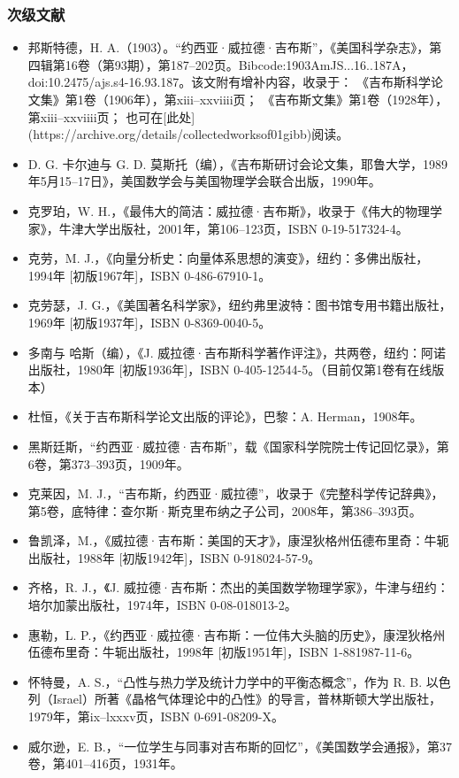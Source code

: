 \subsubsection{次级文献}
\begin{itemize}
\item 邦斯特德，H. A.（1903）。“约西亚·威拉德·吉布斯”，《美国科学杂志》，第四辑第16卷（第93期），第187–202页。Bibcode:1903AmJS...16..187A，doi:10.2475/ajs.s4-16.93.187。该文附有增补内容，收录于：
《吉布斯科学论文集》第1卷（1906年），第xiii–xxviiii页；
《吉布斯文集》第1卷（1928年），第xiii–xxviiii页；
也可在[此处](https://archive.org/details/collectedworksof01gibb)阅读。
\item D. G. 卡尔迪与 G. D. 莫斯托（编），《吉布斯研讨会论文集，耶鲁大学，1989年5月15–17日》，美国数学会与美国物理学会联合出版，1990年。
\item 克罗珀，W. H.，《最伟大的简洁：威拉德·吉布斯》，收录于《伟大的物理学家》，牛津大学出版社，2001年，第106–123页，ISBN 0-19-517324-4。
\item 克劳，M. J.，《向量分析史：向量体系思想的演变》，纽约：多佛出版社，1994年 [初版1967年]，ISBN 0-486-67910-1。
\item 克劳瑟，J. G.，《美国著名科学家》，纽约弗里波特：图书馆专用书籍出版社，1969年 [初版1937年]，ISBN 0-8369-0040-5。
\item 多南与 哈斯（编），《J. 威拉德·吉布斯科学著作评注》，共两卷，纽约：阿诺出版社，1980年 [初版1936年]，ISBN 0-405-12544-5。（目前仅第1卷有在线版本）
\item 杜恒，《关于吉布斯科学论文出版的评论》，巴黎：A. Herman，1908年。
\item 黑斯廷斯，“约西亚·威拉德·吉布斯”，载《国家科学院院士传记回忆录》，第6卷，第373–393页，1909年。
\item 克莱因，M. J.，“吉布斯，约西亚·威拉德”，收录于《完整科学传记辞典》，第5卷，底特律：查尔斯·斯克里布纳之子公司，2008年，第386–393页。
\item 鲁凯泽，M.，《威拉德·吉布斯：美国的天才》，康涅狄格州伍德布里奇：牛轭出版社，1988年 [初版1942年]，ISBN 0-918024-57-9。
\item 齐格，R. J.，《J. 威拉德·吉布斯：杰出的美国数学物理学家》，牛津与纽约：培尔加蒙出版社，1974年，ISBN 0-08-018013-2。
\item 惠勒，L. P.，《约西亚·威拉德·吉布斯：一位伟大头脑的历史》，康涅狄格州伍德布里奇：牛轭出版社，1998年 [初版1951年]，ISBN 1-881987-11-6。
\item 怀特曼，A. S.，“凸性与热力学及统计力学中的平衡态概念”，作为 R. B. 以色列（Israel）所著《晶格气体理论中的凸性》的导言，普林斯顿大学出版社，1979年，第ix–lxxxv页，ISBN 0-691-08209-X。
\item 威尔逊，E. B.，“一位学生与同事对吉布斯的回忆”，《美国数学会通报》，第37卷，第401–416页，1931年。
\end{itemize}
